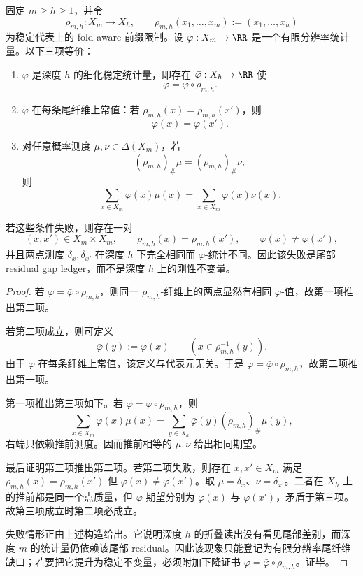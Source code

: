 \begin{proposition}[残差统计的尾纤维下降判别]\label{distill:cech_cohomology-refinement_stability_separation-frt-tail-fibre-descent-criterion}
固定 \(m\ge h\ge1\)，并令
\[
\rho_{m,h}:X_m\longrightarrow X_h,\qquad
\rho_{m,h}(x_1,\ldots,x_m):=(x_1,\ldots,x_h)
\]
为稳定代表上的 fold-aware 前缀限制。设 \(\varphi:X_m\to\RR\) 是一个有限分辨率统计量。以下三项等价：
\begin{enumerate}
  \item \(\varphi\) 是深度 \(h\) 的细化稳定统计量，即存在 \(\bar\varphi:X_h\to\RR\) 使
  \[
  \varphi=\bar\varphi\circ\rho_{m,h}.
  \]
  \item \(\varphi\) 在每条尾纤维上常值：若 \(\rho_{m,h}(x)=\rho_{m,h}(x')\)，则
  \[
  \varphi(x)=\varphi(x').
  \]
  \item 对任意概率测度 \(\mu,\nu\in\Delta(X_m)\)，若
  \[
  (\rho_{m,h})_\#\mu=(\rho_{m,h})_\#\nu,
  \]
  则
  \[
  \sum_{x\in X_m}\varphi(x)\mu(x)=
  \sum_{x\in X_m}\varphi(x)\nu(x).
  \]
\end{enumerate}
若这些条件失败，则存在一对
\[
(x,x')\in X_m\times X_m,\qquad \rho_{m,h}(x)=\rho_{m,h}(x'),\qquad \varphi(x)\ne\varphi(x'),
\]
并且两点测度 \(\delta_x,\delta_{x'}\) 在深度 \(h\) 下完全相同而 \(\varphi\)-统计不同。因此该失败是尾部 residual gap ledger，而不是深度 \(h\) 上的刚性不变量。
\end{proposition}
\begin{proof}
若 \(\varphi=\bar\varphi\circ\rho_{m,h}\)，则同一 \(
\rho_{m,h}\)-纤维上的两点显然有相同 \(\varphi\)-值，故第一项推出第二项。

若第二项成立，则可定义
\[
\bar\varphi(y):=\varphi(x)\qquad(x\in\rho_{m,h}^{-1}(y)).
\]
由于 \(\varphi\) 在每条纤维上常值，该定义与代表元无关。于是
\(\varphi=\bar\varphi\circ\rho_{m,h}\)，故第二项推出第一项。

第一项推出第三项如下。若 \(\varphi=\bar\varphi\circ\rho_{m,h}\)，则
\[
\sum_{x\in X_m}\varphi(x)
\mu(x)
=
\sum_{y\in X_h}\bar\varphi(y)(\rho_{m,h})_\#\mu(y),
\]
右端只依赖推前测度。因而推前相等的 \(\mu,\nu\) 给出相同期望。

最后证明第三项推出第二项。若第二项失败，则存在 \(x,x'\in X_m\) 满足
\(\rho_{m,h}(x)=\rho_{m,h}(x')\) 但 \(\varphi(x)\ne\varphi(x')\)。取
\(\mu=\delta_x\)、\(\nu=\delta_{x'}\)。二者在 \(X_h\) 上的推前都是同一个点质量，但 \(\varphi\)-期望分别为 \(\varphi(x)\) 与 \(\varphi(x')\)，矛盾于第三项。故第三项成立时第二项必成立。

失败情形正由上述构造给出。它说明深度 \(h\) 的折叠读出没有看见尾部差别，而深度 \(m\) 的统计量仍依赖该尾部 residual。因此该现象只能登记为有限分辨率尾纤维缺口；若要把它提升为稳定不变量，必须附加下降证书 \(\varphi=\bar\varphi\circ\rho_{m,h}\)。证毕。
\end{proof}

